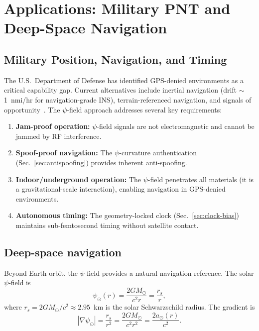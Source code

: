 \documentclass[aps,prd,twocolumn,superscriptaddress,nofootinbib]{revtex4-2}
\begin{document}
\section{Applications: Military PNT and Deep-Space
Navigation}\label{sec:applications}

\subsection{Military Position, Navigation, and
Timing}\label{sec:military-pnt}

The U.S.\ Department of Defense has identified GPS-denied
environments as a critical capability gap. Current alternatives
include inertial navigation (drift $\sim$1~nmi/hr for
navigation-grade INS), terrain-referenced navigation, and signals
of opportunity~\cite{DOD_PNT2021}. The $\psi$-field approach
addresses several key requirements:

\begin{enumerate}
\item \textbf{Jam-proof operation:} $\psi$-field signals are not
electromagnetic and cannot be jammed by RF interference.
\item \textbf{Spoof-proof navigation:} The $\psi$-curvature
authentication (Sec.~\ref{sec:antispoofing}) provides inherent
anti-spoofing.
\item \textbf{Indoor/underground operation:} The $\psi$-field
penetrates all materials (it is a gravitational-scale interaction),
enabling navigation in GPS-denied environments.
\item \textbf{Autonomous timing:} The geometry-locked clock
(Sec.~\ref{sec:clock-bias}) maintains sub-femtosecond timing without
satellite contact.
\end{enumerate}

\subsection{Deep-space navigation}\label{sec:deep-space}

Beyond Earth orbit, the $\psi$-field provides a natural navigation
reference. The solar $\psi$-field is
\begin{equation}\label{eq:solar-psi}
\psi_\odot(r) = \frac{2GM_\odot}{c^2 r} = \frac{r_s}{r},
\end{equation}
where $r_s = 2GM_\odot/c^2 \approx 2.95$~km is the solar
Schwarzschild radius. The gradient is
\begin{equation}\label{eq:solar-grad}
|\nabla\psi_\odot| = \frac{r_s}{r^2} = \frac{2GM_\odot}{c^2 r^2}
= \frac{2a_\odot(r)}{c^2}.
\end{equation}
\end{document}
